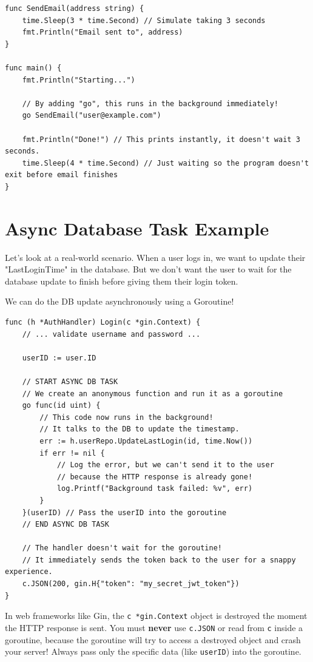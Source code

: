 \documentclass[11pt,a4paper]{article}
\begin{document}
\begin{lstlisting}
func SendEmail(address string) {
    time.Sleep(3 * time.Second) // Simulate taking 3 seconds
    fmt.Println("Email sent to", address)
}

func main() {
    fmt.Println("Starting...")
    
    // By adding "go", this runs in the background immediately!
    go SendEmail("user@example.com") 
    
    fmt.Println("Done!") // This prints instantly, it doesn't wait 3 seconds.
    time.Sleep(4 * time.Second) // Just waiting so the program doesn't exit before email finishes
}
\end{lstlisting}

\section{Async Database Task Example}
Let's look at a real-world scenario. When a user logs in, we want to update their "LastLoginTime" in the database. But we don't want the user to wait for the database update to finish before giving them their login token. 

We can do the DB update asynchronously using a Goroutine!

\begin{lstlisting}
func (h *AuthHandler) Login(c *gin.Context) {
    // ... validate username and password ...
    
    userID := user.ID

    // START ASYNC DB TASK
    // We create an anonymous function and run it as a goroutine
    go func(id uint) {
        // This code now runs in the background!
        // It talks to the DB to update the timestamp.
        err := h.userRepo.UpdateLastLogin(id, time.Now())
        if err != nil {
            // Log the error, but we can't send it to the user 
            // because the HTTP response is already gone!
            log.Printf("Background task failed: %v", err)
        }
    }(userID) // Pass the userID into the goroutine
    // END ASYNC DB TASK

    // The handler doesn't wait for the goroutine! 
    // It immediately sends the token back to the user for a snappy experience.
    c.JSON(200, gin.H{"token": "my_secret_jwt_token"})
}
\end{lstlisting}
\begin{tcolorbox}[colback=red!5!white,colframe=red!75!black,title=\textbf{Important Warning}]
In web frameworks like Gin, the \texttt{c *gin.Context} object is destroyed the moment the HTTP response is sent. You must \textbf{never} use \texttt{c.JSON} or read from \texttt{c} inside a goroutine, because the goroutine will try to access a destroyed object and crash your server! Always pass only the specific data (like \texttt{userID}) into the goroutine.
\end{tcolorbox}
\end{document}
